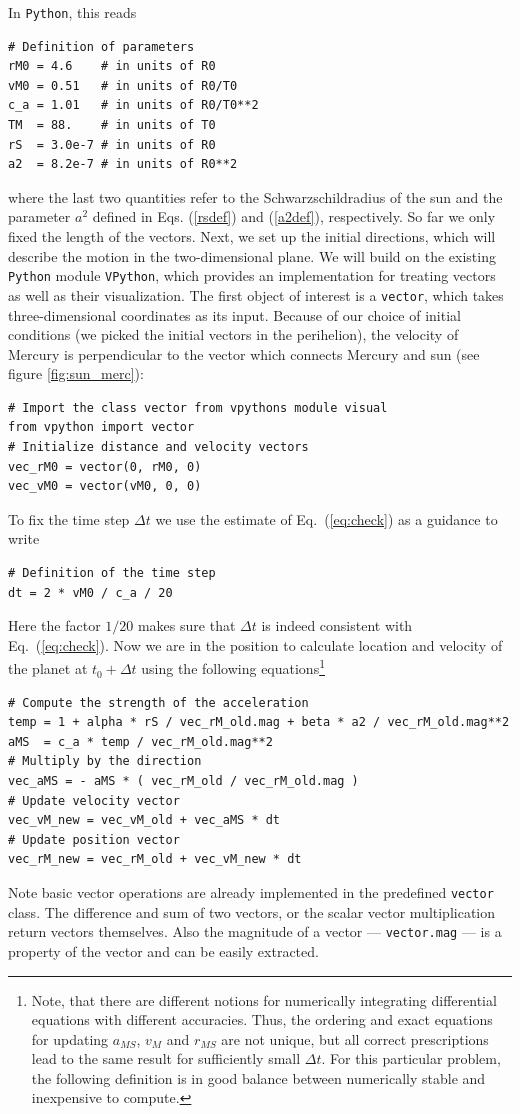 \documentclass[12pt,ngerman,american]{iopart}
\newcommand{\python}[0]{\texttt{Python}}
\begin{document}
In \python{}, this reads
\begin{lstlisting}
# Definition of parameters
rM0 = 4.6    # in units of R0
vM0 = 0.51   # in units of R0/T0
c_a = 1.01   # in units of R0/T0**2
TM  = 88.    # in units of T0
rS  = 3.0e-7 # in units of R0
a2  = 8.2e-7 # in units of R0**2
\end{lstlisting}
where the last two quantities refer to the Schwarzschildradius of the sun and the parameter $a^2$ defined in Eqs. (\ref{rsdef}) and (\ref{a2def}), respectively.
So far we only fixed the length of the vectors.
Next, we set up the initial directions, which will describe the motion in the two-dimensional plane.  We will build on the existing \python{} module \texttt{VPython}, which provides an implementation for treating vectors as well as their visualization.
The first object of interest is a \texttt{vector}, which takes three-dimensional coordinates as its input.
Because of our choice of initial conditions (we picked the initial vectors in the perihelion), the velocity of Mercury is perpendicular to the vector which connects Mercury and sun (see figure \ref{fig:sun_merc}):
\begin{lstlisting}
# Import the class vector from vpythons module visual
from vpython import vector
# Initialize distance and velocity vectors
vec_rM0 = vector(0, rM0, 0)
vec_vM0 = vector(vM0, 0, 0)
\end{lstlisting}
To fix the time step $\Delta t$ we use the estimate of Eq.~(\ref{eq:check}) as a guidance to write
\begin{lstlisting}
# Definition of the time step
dt = 2 * vM0 / c_a / 20
\end{lstlisting}
Here the factor $1/20$ makes sure that $\Delta t$ is indeed consistent with Eq.~(\ref{eq:check}).
Now we are in the position to calculate location and velocity of the planet at $t_0+\Delta t$ using the following equations\footnote{%
	Note, that there are different notions for numerically integrating differential equations with different accuracies.
	Thus, the ordering and exact equations for updating $a_{MS}$, $v_M$ and $r_{MS}$ are not unique, but all correct prescriptions lead to the same result for sufficiently small $\Delta t$.
	For this particular problem, the following definition is in good balance between numerically stable and inexpensive to compute.
}%
\begin{lstlisting}
# Compute the strength of the acceleration
temp = 1 + alpha * rS / vec_rM_old.mag + beta * a2 / vec_rM_old.mag**2
aMS  = c_a * temp / vec_rM_old.mag**2
# Multiply by the direction
vec_aMS = - aMS * ( vec_rM_old / vec_rM_old.mag )
# Update velocity vector
vec_vM_new = vec_vM_old + vec_aMS * dt
# Update position vector
vec_rM_new = vec_rM_old + vec_vM_new * dt
\end{lstlisting}
Note basic vector operations are already implemented in the predefined \texttt{vector} class.
The difference and sum of two vectors, or the scalar vector multiplication return vectors themselves.
Also the magnitude of a vector --- \texttt{vector.mag} --- is a property of the vector and can be easily extracted.
\end{document}
